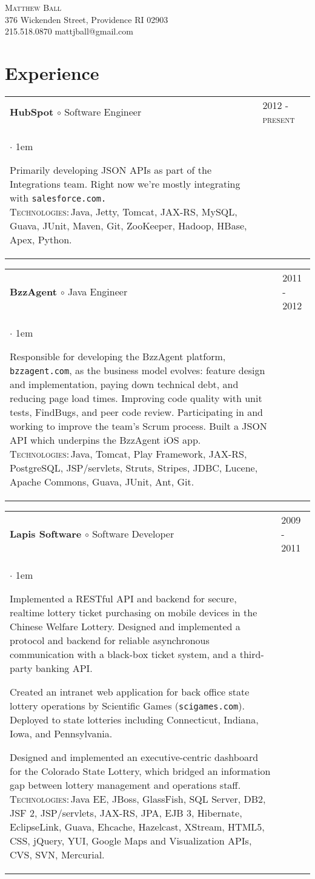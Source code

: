 \documentclass[10pt]{article}
\makeatletter
\newcommand{\employer}[4]
	{{ \begin{tabular}{l@{\hspace{5mm}}|p{30mm}}
	   \multicolumn{1}{l}{\textbf{#1 $\circ$ }#2}&\multicolumn{1}{p{30mm}}{\hspace{-3mm}\textsc{#3}} \\
	   \parbox{.825\textwidth}{#4 \vspace*{-4pt}}
	   \end{tabular} \vspace{4pt} }}
\newcommand{\contact}[4]
	{\begin{center}
		{\LARGE \scshape{#1}}\\
		#2\\
		\Telefon \hspace{0.5ex} #3 \hspace{1em} \Letter \hspace{0.5ex} #4
	\end{center}
	\vspace*{-8pt}}
\newenvironment{achievements}           %
	{\begin{list}{$\cdot$}{\topsep 0pt \itemsep 4pt \parsep 0pt \leftmargin 1em}
	 \linespread{1.05} \selectfont %
	}
	{\end{list}\vspace*{4pt}}
\def\kt{\vspace*{2pt}\\\textsc{Technologies:\,}}
\makeatother
\begin{document}
\contact{Matthew Ball}
{376 Wickenden Street, Providence RI 02903}
{215.518.0870}
{mattjball@gmail.com}

\section{Experience}
\employer{HubSpot}{Software Engineer}{2012 - present}{
	\begin{achievements}
	
	\item{Primarily developing JSON APIs as part of the Integrations team. Right now we're mostly integrating with \texttt{salesforce.com.} \kt Java, Jetty, Tomcat, JAX-RS, MySQL, Guava, JUnit, Maven, Git, ZooKeeper, Hadoop, HBase, Apex, Python. }
	
	\end{achievements}
}

\employer{BzzAgent}{Java Engineer}{2011 - 2012}{
	\begin{achievements}
	
	\item{Responsible for developing the BzzAgent platform, \texttt{bzzagent.com}, as the business model evolves: feature design and implementation, paying down technical debt, and reducing page load times. Improving code quality with unit tests, FindBugs, and peer code review. Participating in and working to improve the team's Scrum process. Built a JSON API which underpins the BzzAgent iOS app. \kt Java, Tomcat, Play Framework, JAX-RS, PostgreSQL, JSP/servlets, Struts, Stripes, JDBC, Lucene, Apache Commons, Guava, JUnit, Ant, Git.}
	
	\end{achievements}
}

\employer{Lapis Software}{Software Developer}{2009 - 2011}{
	\begin{achievements}
	
	\item{Implemented a RESTful API and backend for secure, realtime lottery ticket purchasing on mobile devices in the Chinese Welfare Lottery. Designed and implemented a protocol and backend for reliable asynchronous communication with a black-box ticket system, and a third-party banking API.}
	
\item{Created an intranet web application for back office state lottery operations by Scientific Games (\texttt{scigames.com}). Deployed to state lotteries including Connecticut, Indiana, Iowa, and Pennsylvania.}
	
\item{Designed and implemented an executive-centric dashboard for the Colorado State Lottery, which bridged an information gap between lottery management and operations staff. \kt Java EE, JBoss, GlassFish, SQL Server, DB2, JSF 2, JSP/servlets, JAX-RS, JPA, EJB 3, Hibernate, EclipseLink, Guava, Ehcache, Hazelcast, XStream, HTML5, CSS, jQuery, YUI, Google Maps and Visualization APIs, CVS, SVN, Mercurial.}
	
	\end{achievements}
}
\end{document}
